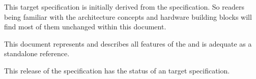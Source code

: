 This \aschip \; target specification is initially derived from the \asrvi \; specification. So readers being familiar with the \asrvi \; architecture concepts and hardware building blocks will find most of them unchanged within this document.

This \aschip \; document represents and describes all features of the \aschip \; and is adequate as a standalone reference.

This release of the specification has the status of an target specification.
